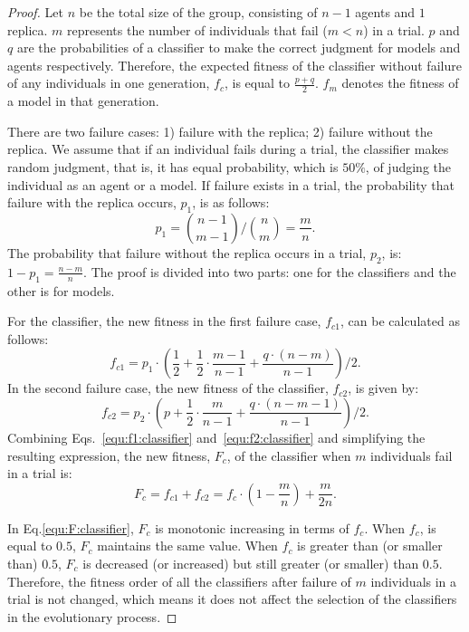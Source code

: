 \begin{proof}
Let $n$ be the total size of the group, consisting of $n-1$ agents and $1$ replica. $m$ represents the number of individuals that fail ($m<n$) in a trial. $p$ and $q$ are the probabilities of a classifier to make the correct judgment for models and agents respectively. Therefore, the expected fitness of the classifier without failure of any individuals in one generation, $f_c$, is equal to $\frac{p+q}{2}$. $f_m$ denotes the fitness of a model in that generation. 

There are two failure cases: 1) failure with the replica; 2) failure without the replica. We assume that if an individual fails during a trial, the classifier makes random judgment, that is, it has equal probability, which is $50\%$, of judging the individual as an agent or a model. If failure exists in a trial, the probability that failure with the replica occurs, $p_1$, is as follows:
\begin{equation}
{p_1} = {\binom{n-1}{m-1}} / {\binom{n}{m}} = \frac{m}{n}.
\end{equation}
The probability that failure without the replica occurs in a trial, $p_2$, is: $1 - p_1 = \frac{n-m}{n}$. The proof is divided into two parts: one for the classifiers and the other is for models.

For the classifier, the new fitness in the first failure case, $f_{c1}$, can be calculated as follows:
\begin{equation}\label{equ:f1:classifier}
{f_{c1}} = p_1 \cdot (\frac{1}{2} + \frac{1}{2} \cdot \frac{m-1}{n-1} + \frac{q \cdot (n-m)}{n-1}) /2.
\end{equation}
In the second failure case, the new fitness of the classifier, $f_{c2}$, is given by:
\begin{equation}\label{equ:f2:classifier}
{f_{c2}} = p_2 \cdot (p + \frac{1}{2} \cdot \frac{m}{n-1} + \frac{q \cdot (n-m-1)}{n-1}) / 2.
\end{equation}
Combining Eqs.~\eqref{equ:f1:classifier} and~\eqref{equ:f2:classifier} and simplifying the resulting expression, the new fitness, $F_c$, of the classifier when $m$ individuals fail in a trial is:
\begin{equation}\label{equ:F:classifier}
{F_c} = f_{c1} + f_{c2} = f_c \cdot (1-\frac{m}{n}) + \frac{m}{2n}.
\end{equation}

In Eq.\eqref{equ:F:classifier}, $F_c$ is monotonic increasing in terms of $f_c$. When $f_c$, is equal to $0.5$, $F_c$ maintains the same value. When $f_c$ is greater than (or smaller than) $0.5$, $F_c$ is decreased (or increased) but still greater (or smaller) than $0.5$. Therefore, the fitness order of all the classifiers after failure of $m$ individuals in a trial is not changed, which means it does not affect the selection of the classifiers in the evolutionary process. 


\end{proof}
